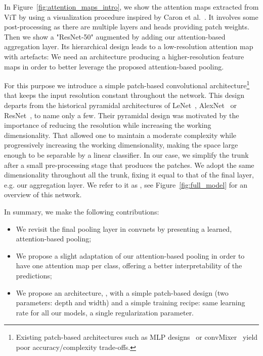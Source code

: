 In Figure~\ref{fig:attention_maps_intro}, we show the attention maps extracted from ViT by using a visualization procedure inspired by Caron et al.~\cite{caron2021emerging}. It involves some post-processing as there are multiple layers and heads providing patch weights. 
Then we show a "ResNet-50" augmented by adding our attention-based aggregation layer. Its hierarchical design leads to a low-resolution  attention map with artefacts: We need an architecture producing a higher-resolution feature maps in order to better leverage the proposed attention-based pooling. 
 
% 
For this purpose we introduce a simple patch-based convolutional architecture\footnote{Existing patch-based architectures such as MLP designs~\cite{tolstikhin2021MLPMixer,Touvron2021ResMLPFN,ding2021repmlp} or  convMixer~\cite{anonymous2022patches} yield poor accuracy/complexity trade-offs. } that keeps the input resolution constant throughout the network.
This design departs from the historical pyramidal architectures of LeNet~\cite{lecun1989backpropagation}, AlexNet~\cite{Krizhevsky2012AlexNet} or ResNet~\cite{He2016ResNet,He2016IdentityMappings}, to name only a few. 
Their pyramidal design was motivated by the importance of reducing the resolution while increasing the working dimensionality.
That allowed one to maintain a moderate complexity while progressively increasing the working dimensionality, making the space large enough to be separable by a linear classifier.
In our case, we simplify the trunk after a small pre-processing stage that produces the patches. We adopt the same dimensionality throughout all the trunk, fixing it equal to that of the final layer, e.g. our aggregation layer.
We refer to it as \ournet, see Figure~\ref{fig:full_model} for an overview of this network. 
%

In summary, we make the following contributions: 
\begin{itemize}
    \item We revisit the final pooling layer in convnets by presenting a learned, attention-based pooling;
    
    \item We propose a slight adaptation of our attention-based pooling in order to have one attention map per class, offering a better interpretability of the predictions;
    
    \item We propose an architecture, \ournet{}, with a simple patch-based design (two parameters: depth and width) and a simple training recipe: same learning rate for all our
models, a single regularization parameter. 
\end{itemize}

